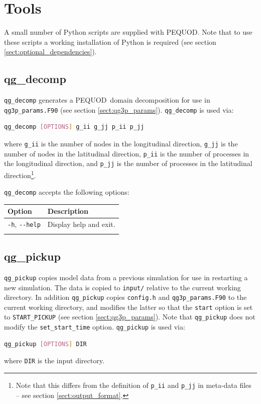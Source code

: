 \documentclass[a4paper]{book}
\newcommand{\pequod}{PEQUOD}
\begin{document}
\chapter{Tools}

A small number of Python scripts are supplied with \pequod. Note that to use
these scripts a working installation of Python is required (see section
\ref{sect:optional_dependencies}).

\section{qg\_decomp}\label{sect:qg_decomp}

\verb+qg_decomp+ generates a \pequod\ domain decomposition for use in \linebreak
\verb+qg3p_params.F90+ (see section \ref{sect:qg3p_params}). \verb+qg_decomp+
is used via:
\begin{lstlisting}[language = bash, frame = single]
qg_decomp [OPTIONS] g_ii g_jj p_ii p_jj
\end{lstlisting}
where \verb+g_ii+ is the number of nodes in the longitudinal direction,
\verb+g_jj+ is the number of nodes in the latitudinal direction, \verb+p_ii+ is
the number of processes in the longitudinal direction, and \verb+p_jj+ is the
number of processes in the latitudinal direction\footnote{Note that this differs
from the definition of \texttt{p\_ii} and \texttt{p\_jj} in meta-data files --
see section \ref{sect:output_format}.}.

\verb+qg_decomp+ accepts the following options:
\begin{longtable}{ | p{} | p{} | }
  \hline
  Option & Description \\
  \hline
  \endhead
  \verb+-h+, \verb+--help+  & Display help and exit. \\
  \hline
  \endfoot
\end{longtable}

\section{qg\_pickup}\label{sect:qg_pickup}

\verb+qg_pickup+ copies model data from a previous simulation for use in
restarting a new simulation. The data is copied to \verb+input/+ relative to the
current working directory. In addition \verb+qg_pickup+ copies \verb+config.h+
and \verb+qg3p_params.F90+ to the current working directory, and modifies the
latter so that the \verb+start+ option is set to \verb+START_PICKUP+ (see
section \ref{sect:qg3p_params}). Note that \verb+qg_pickup+ does not modify the
\verb+set_start_time+ option. \verb+qg_pickup+ is used via:
\begin{lstlisting}[language = bash, frame = single]
qg_pickup [OPTIONS] DIR
\end{lstlisting}
where \verb+DIR+ is the input directory.
\end{document}
